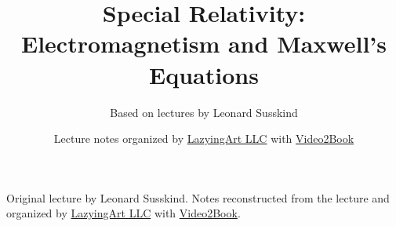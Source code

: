 \documentclass[11pt,oneside]{book}
\begin{document}
\frontmatter
\title{Special Relativity: Electromagnetism and Maxwell's Equations}
\author{Based on lectures by Leonard Susskind}
\date{Lecture notes organized by \href{https://lazying.art}{LazyingArt LLC} with \href{https://github.com/lachlanchen/Video2Book}{Video2Book}}
\maketitle
\begin{center}
\small Original lecture by Leonard Susskind. Notes reconstructed from the lecture and organized by \href{https://lazying.art}{LazyingArt LLC} with \href{https://github.com/lachlanchen/Video2Book}{Video2Book}.
\end{center}
\clearpage
\mainmatter

\end{document}
